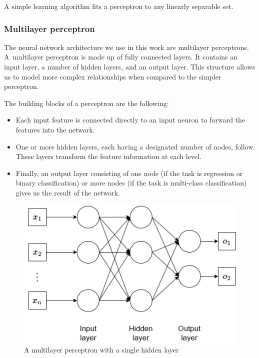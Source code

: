 		
		A simple learning algorithm fits a perceptron to any linearly separable set.


		\bigskip
		\subsubsection{Multilayer perceptron}
		
		The neural network architecture we use in this work are multilayer perceptrons. A multilayer perceptron is made up of fully connected layers. It contains an input layer, a number of hidden layers, and an output layer. This structure allows us to model more complex relationships when compared to the simpler perceptron. 
		
		The building blocks of a perceptron are the following:
		
		\begin{itemize}
			\item Each input feature is connected directly to an input neuron to forward the features into the network.
			\item One or more hidden layers, each having a designated number of nodes, follow. These layers transform the feature information at each level.
			\item Finally, an output layer consisting of one node (if the task is regression or binary classification) or more nodes (if the task is multi-class classification) gives us the result of the network.
		\end{itemize}
		\bigskip
		
		\begin{figure}[H]
			\centering
			\includegraphics[width=0.7\linewidth]{img/img-multilayer-perceptron}
			\caption{A multilayer perceptron with a single hidden layer}
			\label{fig:img-multilayer-perceptron}
		\end{figure}
		\bigskip
		
